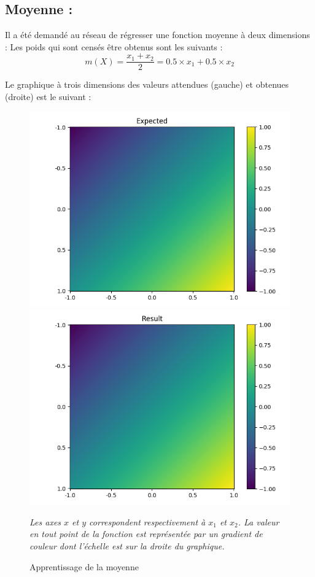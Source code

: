 
\subsection{Moyenne :}\label{subsec:moy}
Il a été demandé au réseau de régresser une fonction moyenne à deux dimensions :
Les poids qui sont censés être obtenus sont les suivants :
\begin{equation}
    \label{eq:moy}
    m(X) =\frac{x_1 + x_2}{2} = 0.5 \times x_1 + 0.5 \times x_2
\end{equation}

Le graphique à trois dimensions des valeurs attendues (gauche) et obtenues (droite) est le suivant :
\begin{figure}[H]
    \center
    \includegraphics[height=\petit]{pict/moy/expected}
    \includegraphics[height=\petit]{pict/moy/result}
	\caption{Apprentissage de la moyenne}
    \vspace{-10pt}
    \begin{center}
        \tiny
        \textit{
        Les axes $x$ et $y$ correspondent respectivement à $x_1$ et $x_2$.
        La valeur en tout point de la fonction est représentée par un gradient de couleur
        dont l'échelle est sur la droite du graphique.
        }
    \end{center}
	\label{fig:moy}
\end{figure}
\vspace{-12pt}

